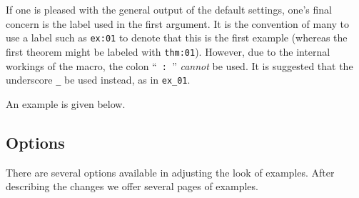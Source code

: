 \documentclass[10pt]{article}
\begin{document}
If one is pleased with the general output of the default settings, one's final concern is the label used in the first argument. It is the convention of many to use a label such as \verb|ex:01| to denote that this is the first example (whereas the first theorem might be labeled with \verb|thm:01|). However, due to the internal workings of the macro, the colon ``\verb| : |'' \textit{cannot} be used. It is suggested that the underscore \verb|_| be used instead, as in \verb|ex_01|. 

An example is given below.\\



\subsection{Options}

There are several options available in adjusting the look of examples. After describing the changes we offer several pages of examples.
\end{document}
